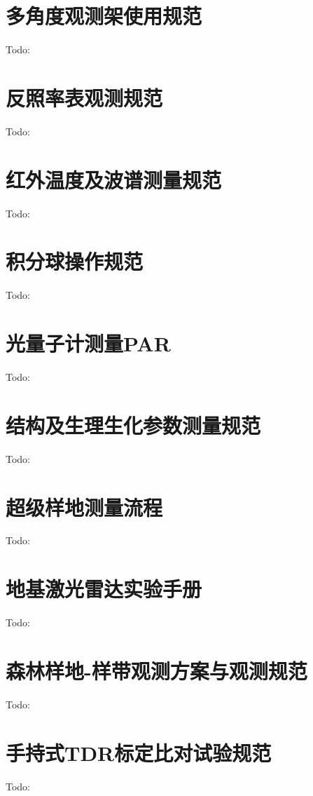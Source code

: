 \documentclass[letterpaper,10pt,english]{sphinxmanual}
\begin{document}
\section{多角度观测架使用规范}
\label{observe_standard:id13}
Todo:


\section{反照率表观测规范}
\label{observe_standard:id14}
Todo:


\section{红外温度及波谱测量规范}
\label{observe_standard:id15}
Todo:


\section{积分球操作规范}
\label{observe_standard:id16}
Todo:


\section{光量子计测量PAR}
\label{observe_standard:par}
Todo:


\section{结构及生理生化参数测量规范}
\label{observe_standard:id17}
Todo:


\section{超级样地测量流程}
\label{observe_standard:id18}
Todo:


\section{地基激光雷达实验手册}
\label{observe_standard:id19}
Todo:


\section{森林样地-样带观测方案与观测规范}
\label{observe_standard:id20}
Todo:


\section{手持式TDR标定比对试验规范}
\label{observe_standard:tdr}
Todo:
\end{document}
